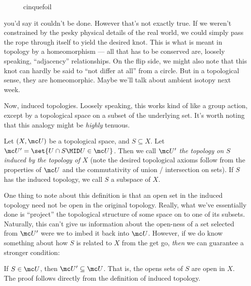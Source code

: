 \documentclass{fkbook}
\begin{document}
\begin{adjustwidth}{1em}{1em}
\begin{figure}[H]
\begin{tikzpicture}
    \end{tikzpicture}
    \caption{cinquefoil}
  \end{figure}
  you'd say it couldn't be done. However that's not exactly true. If
  we weren't constrained by the pesky physical details of the real
  world, we could simply pass the rope through itself to yield the
  desired knot. This is what is meant in topology by a homeomorphism
  --- all that has to be conserved are, loosely speaking,
  ``adjacency'' relationships. On the flip side, we might also note
  that this knot can hardly be said to ``not differ at all'' from a
  circle. But in a topological sense, they are homeomorphic. Maybe
  we'll talk about ambient isotopy next week.

  Now, induced topologies. Loosely speaking, this works kind of like a
  group action, except by a topological space on a subset of the
  underlying set. It's worth noting that this analogy might be
  \emph{highly} tenuous.
  \begin{definition}
    Let $(X, \mc U)$ be a topological space, and $S \subseteq X$. Let
    $\mc U' = \set{U \cap S \MID U \in \mc U}$. Then we call $\mc U'$
    \emph{the topology on $S$ induced by the topology of $X$} (note
    the desired topological axioms follow from the properties of $\mc
    U$ and the commutativity of union / intersection on sets). If $S$
    has the induced topology, we call $S$ a subspace of $X$.
  \end{definition}
  One thing to note about this definition is that an open set in the
  induced topology need not be open in the original topology. Really,
  what we've essentially done is ``project'' the topological structure
  of some space on to one of its subsets. Naturally, this can't give
  us information about the open-ness of a set selected from $\mc U'$
  were we to imbed it back into $\mc U$. However, if we do know
  something about how $S$ is related to $X$ from the get go,
  \emph{then} we can guarantee a stronger condition:
  \begin{theorem}
    If $S \in \mc U$, then $\mc U' \subseteq \mc U$. That is, the
    opens sets of $S$ are open in $X$. The proof follows directly from
    the definition of induced topology.
  \end{theorem}

\end{adjustwidth}
\end{document}
